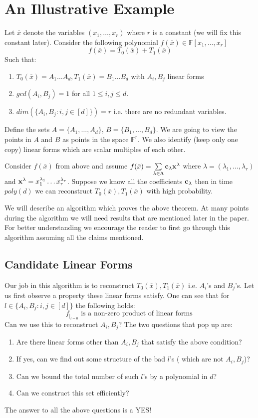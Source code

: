 \documentclass[letterpaper,USenglish,numberwithinsect]{lipics}
\newcommand{\F}{\mathbb{F}}
\newcommand{\B}[1]{\bar{#1}}
\begin{document}
\section{An Illustrative Example}
Let $\B{x}$ denote the variables $(x_1,\ldots,x_r)$ where $r$ is a constant (we will fix this constant later).
Consider the following polynomial $f(\B{x})\in \F[x_1,\ldots,x_r]$
\[
 f(\B{x}) = T_0(\B{x}) + T_1(\B{x})
\]
Such that:
\begin{enumerate}
\item $T_0(\B{x})=A_1\ldots A_d, T_1(\B{x}) = B_1\ldots B_d$ with $A_i,B_j$ linear forms
 \item $gcd(A_i,B_j)=1$ for all $1\leq i,j\leq d$.
 \item $dim(\{A_i,B_j : i,j \in [d]\}) =r $ i.e. there are no redundant variables.
\end{enumerate}
Define the sets $A = \{A_1,\ldots,A_d\}$, $B=\{B_1,\ldots,B_d\}$. We are going to view the points in $A$ and
$B$ as points in the space $\F^r$. We also identify (keep only one copy) linear forms which are scalar multiples of each other.

\begin{theorem}
Consider $f(\B{x})$ from above and assume $f(\B{x}) = \sum\limits_{\lambda \in \Lambda}{\bf c}_{\lambda} {\bf x}^{\lambda}$ where $\lambda = (\lambda_1,\ldots,\lambda_r)$ and ${\bf x}^\lambda = x_1^{\lambda_1}\ldots x_r^{\lambda_r}$. Suppose we know all the coefficients ${\bf c}_{\lambda}$ then in time $poly(d)$  we can reconstruct $T_0(\B{x}),T_1(\B{x})$ with high probability.
\end{theorem}

We will describe an algorithm which proves the above theorem. At many points during the algorithm we will need results
that are mentioned later in the paper. For better understanding we encourage the reader to first go through this algorithm assuming
all the claims mentioned.

\subsection{Candidate Linear Forms}
Our job in this algorithm is to reconstruct $T_0(\B{x}),T_1(\B{x})$ i.e. $A_i$'s and $B_j$'s. Let us first observe a property these linear forms
satisfy. One can see that for $l\in \{A_i,B_j : i,j\in [d]\}$ the following holds:
\[
 f_{|_{l=0}} \text{ is a non-zero product of linear forms }
\]
Can we use this to reconstruct $A_i,B_j$? The two questions that pop up are:
\begin{enumerate}
 \item Are there linear forms other than $A_i,B_j$ that satisfy the above condition?
 \item If yes, can we find out some structure of the bad $l$'s ( which are not $A_i,B_j$)?
 \item Can we bound the total number of such $l$'s by a polynomial in $d$?
 \item Can we construct this set efficiently?
\end{enumerate}
The answer to all the above questions is a YES!
\end{document}
